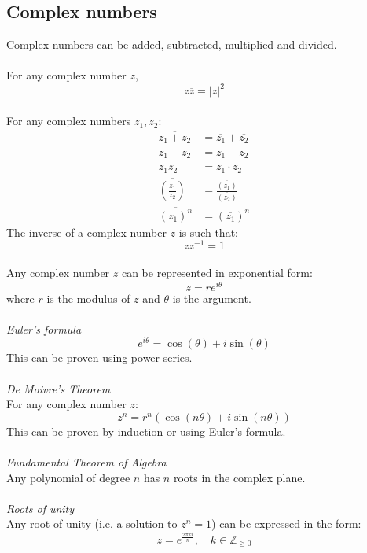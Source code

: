 \documentclass{article}
\newcommand{\Z}{\mathbb{Z}}
\begin{document}
\subsection{Complex numbers}
Complex numbers can be added, subtracted, multiplied and divided.
\\\\
For any complex number $ z $,
\begin{equation}
z \overline{z} = |z| ^{2}
\end{equation}
\\
For any complex numbers $ z_{1}, z_{2} $:
\begin{align}
\overline{z_{1} + z_{2}} & = \overline{z_{1}} + \overline{z_{2}} \\
\overline{z_{1} - z_{2}} & = \overline{z_{1}} - \overline{z_{2}} \\
\overline{z_{1} z_{2}} & = \overline{z_{1}} \cdot \overline{z_{2}} \\
\overline{(\frac{z_{1}}{z_{2}})} & = \frac{\overline{(z_{1})}}{\overline{(z_{2})}} \\
\overline{(z_{1})^{n}} & = (\overline{z_{1}})^{n}
\end{align}
The inverse of a complex number $ z $ is such that:
\begin{equation}
z z^{-1} = 1
\end{equation}
\\
Any complex number $ z $ can be represented in exponential form:
\begin{equation}
z = r e^{i \theta}
\end{equation}
where $ r $ is the modulus of $ z $ and $ \theta $ is the argument.
\\\\
\textit{Euler's formula}
\begin{equation}
e^{i \theta} = \cos(\theta) + i \sin(\theta)
\end{equation}
This can be proven using power series.
\\\\
\textit{De Moivre's Theorem}
\\
For any complex number $ z $:
\begin{equation}
z^{n} = r^{n} (\cos(n \theta) + i \sin(n \theta))
\end{equation}
This can be proven by induction or using Euler's formula.
\\\\
\textit{Fundamental Theorem of Algebra}
\\
Any polynomial of degree $ n $ has $ n $ roots in the complex plane.
\\\\
\textit{Roots of unity}
\\
Any root of unity (i.e. a solution to $ z^{n} = 1 $) can be expressed in the form:
\begin{equation}
z = e^{\frac{2 \pi k i}{n}}, \quad k \in \Z_{\geq 0}
\end{equation}
\end{document}
